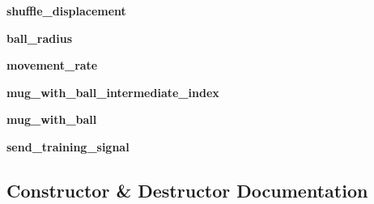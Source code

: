 \begin{DoxyCompactItemize}
\item 
{\bfseries shuffle\+\_\+displacement}\hypertarget{classthimblerigger_1_1Thimblerigger_a82156fb2f87051aa557e849009fa3726}{}\label{classthimblerigger_1_1Thimblerigger_a82156fb2f87051aa557e849009fa3726}

\item 
{\bfseries ball\+\_\+radius}\hypertarget{classthimblerigger_1_1Thimblerigger_a78d0df2afc03a5b6286715d9e386f1f8}{}\label{classthimblerigger_1_1Thimblerigger_a78d0df2afc03a5b6286715d9e386f1f8}

\item 
{\bfseries movement\+\_\+rate}\hypertarget{classthimblerigger_1_1Thimblerigger_a3b7c954f3f4ad08807d5b72f021af561}{}\label{classthimblerigger_1_1Thimblerigger_a3b7c954f3f4ad08807d5b72f021af561}

\item 
{\bfseries mug\+\_\+with\+\_\+ball\+\_\+intermediate\+\_\+index}\hypertarget{classthimblerigger_1_1Thimblerigger_ab7b7fe3d00cc03647329282ed765456c}{}\label{classthimblerigger_1_1Thimblerigger_ab7b7fe3d00cc03647329282ed765456c}

\item 
{\bfseries mug\+\_\+with\+\_\+ball}\hypertarget{classthimblerigger_1_1Thimblerigger_a9fec172e829583bfe6c1f31c719b933d}{}\label{classthimblerigger_1_1Thimblerigger_a9fec172e829583bfe6c1f31c719b933d}

\item 
{\bfseries send\+\_\+training\+\_\+signal}\hypertarget{classthimblerigger_1_1Thimblerigger_ac83105705969ba7f738050440c3777fc}{}\label{classthimblerigger_1_1Thimblerigger_ac83105705969ba7f738050440c3777fc}

\end{DoxyCompactItemize}


\subsection{Constructor \& Destructor Documentation}
